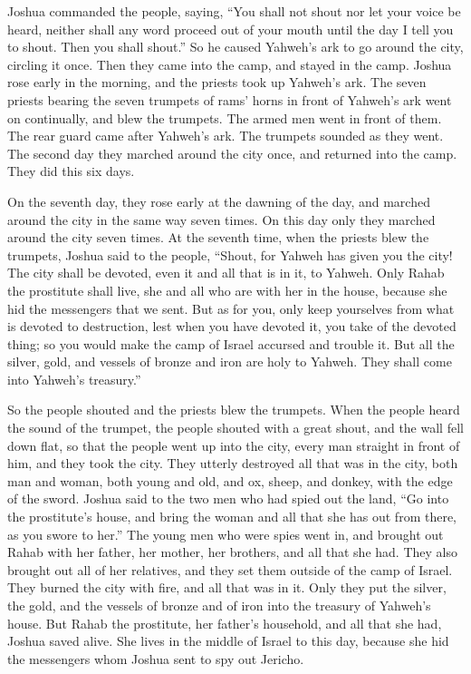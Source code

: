 \begin{paracol}{2}
\begin{otherlanguage}{english}
 Joshua commanded the people, saying, ``You shall not
shout nor let your voice be heard, neither shall any word proceed out of
your mouth until the day I tell you to shout. Then you shall shout.''
 So he caused Yahweh's ark to go around the city,
circling it once. Then they came into the camp, and stayed in the camp.
 Joshua rose early in the morning, and the priests took
up Yahweh's ark.  The seven priests bearing the seven
trumpets of rams' horns in front of Yahweh's ark went on continually,
and blew the trumpets. The armed men went in front of them. The rear
guard came after Yahweh's ark. The trumpets sounded as they went.
 The second day they marched around the city once, and
returned into the camp. They did this six days.

 On the seventh day, they rose early at the dawning of
the day, and marched around the city in the same way seven times. On
this day only they marched around the city seven times. 
At the seventh time, when the priests blew the trumpets, Joshua said to
the people, ``Shout, for Yahweh has given you the city! 
The city shall be devoted, even it and all that is in it, to Yahweh.
Only Rahab the prostitute shall live, she and all who are with her in
the house, because she hid the messengers that we sent. 
But as for you, only keep yourselves from what is devoted to
destruction, lest when you have devoted it, you take of the devoted
thing; so you would make the camp of Israel accursed and trouble it.
 But all the silver, gold, and vessels of bronze and iron
are holy to Yahweh. They shall come into Yahweh's treasury.''

 So the people shouted and the priests blew the trumpets.
When the people heard the sound of the trumpet, the people shouted with
a great shout, and the wall fell down flat, so that the people went up
into the city, every man straight in front of him, and they took the
city.  They utterly destroyed all that was in the city,
both man and woman, both young and old, and ox, sheep, and donkey, with
the edge of the sword.  Joshua said to the two men who
had spied out the land, ``Go into the prostitute's house, and bring the
woman and all that she has out from there, as you swore to her.''
 The young men who were spies went in, and brought out
Rahab with her father, her mother, her brothers, and all that she had.
They also brought out all of her relatives, and they set them outside of
the camp of Israel.  They burned the city with fire, and
all that was in it. Only they put the silver, the gold, and the vessels
of bronze and of iron into the treasury of Yahweh's house.
 But Rahab the prostitute, her father's household, and
all that she had, Joshua saved alive. She lives in the middle of Israel
to this day, because she hid the messengers whom Joshua sent to spy out
Jericho.


\end{otherlanguage}
\end{paracol}
